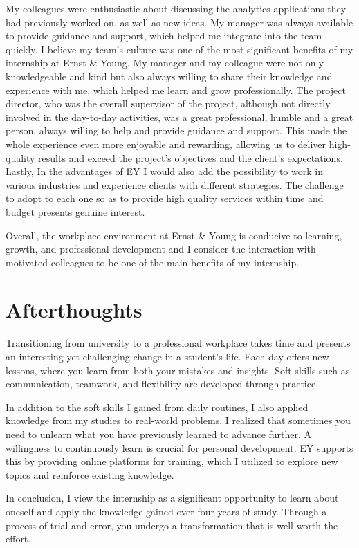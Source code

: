 My colleagues were enthusiastic about discussing the analytics applications
they had previously worked on, as well as new ideas. My manager was always
available to provide guidance and support, which helped me integrate into the
team quickly. I believe my team's culture was one of the most significant
benefits of my internship at Ernst \& Young. My manager and my colleague were
not only knowledgeable and kind but also always willing to share their
knowledge and experience with me, which helped me learn and grow
professionally. The project director, who was the overall supervisor of the
project, although not directly involved in the day-to-day activities, was a
great professional, humble and a great person, always willing to help and
provide guidance and support. This made the whole experience even more
enjoyable and rewarding, allowing us to deliver high-quality results and exceed
the project's objectives and the client's expectations. Lastly, In the
advantages of EY I would also add the possibility to work in various industries
and experience clients with different strategies. The challenge to adopt to
each one so as to provide high quality services within time and budget presents
genuine interest.

Overall, the workplace environment at Ernst \& Young is conducive to learning,
growth, and professional development and I consider the interaction with
motivated colleagues to be one of the main benefits of my internship.

\section{Afterthoughts}

Transitioning from university to a professional workplace takes time and
presents an interesting yet challenging change in a student's life. Each day
offers new lessons, where you learn from both your mistakes and insights. Soft
skills such as communication, teamwork, and flexibility are developed through
practice.

In addition to the soft skills I gained from daily routines, I also applied
knowledge from my studies to real-world problems. I realized that sometimes you
need to unlearn what you have previously learned to advance further. A
willingness to continuously learn is crucial for personal development. EY
supports this by providing online platforms for training, which I utilized to
explore new topics and reinforce existing knowledge.

In conclusion, I view the internship as a significant opportunity to learn
about oneself and apply the knowledge gained over four years of study. Through
a process of trial and error, you undergo a transformation that is well worth
the effort.